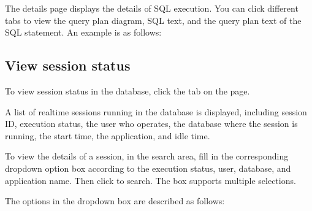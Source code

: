 \documentclass[letterpaper,10pt,english]{sphinxmanual}
\begin{document}
\noindent{}

\sphinxAtStartPar
The details page displays the details of SQL execution. You can click different tabs to view the query plan diagram, SQL text, and the query plan text of the SQL statement. An example is as follows:

\noindent{}


\subsection{View session status}
\label{\detokenize{manage-system/web-platform-monitoring/web-platform-sql-monitor-info:view-session-status}}
\sphinxAtStartPar
To view session status in the database, click the  tab on the  page.

\sphinxAtStartPar
A list of real\sphinxhyphen{}time sessions running in the database is displayed, including session ID, execution status, the user who operates, the database where the session is running, the start time, the application, and idle time.

\noindent{}

\sphinxAtStartPar
To view the details of a session, in the search area, fill in the corresponding drop\sphinxhyphen{}down option box according to the execution status, user, database, and application name. Then click  to search. The  box supports multiple selections.

\sphinxAtStartPar
The options in the  drop\sphinxhyphen{}down box are described as follows:
\end{document}

